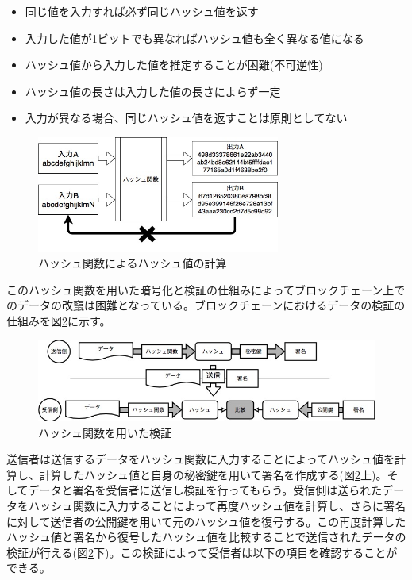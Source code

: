 \documentclass[12pt]{jarticle}
\begin{document}
\begin{itemize}
\item 同じ値を入力すれば必ず同じハッシュ値を返す
\item 入力した値が1ビットでも異なればハッシュ値も全く異なる値になる
\item ハッシュ値から入力した値を推定することが困難(不可逆性)
\item ハッシュ値の長さは入力した値の長さによらず一定
\item 入力が異なる場合、同じハッシュ値を返すことは原則としてない
\end{itemize}

\begin{figure}[h]
 \centering
   \includegraphics[width=80mm]{figures/hash.jpg}
 \caption{ハッシュ関数によるハッシュ値の計算}
 \label{tree1}
\end{figure}

このハッシュ関数を用いた暗号化と検証の仕組みによってブロックチェーン上でのデータの改竄は困難となっている。ブロックチェーンにおけるデータの検証の仕組みを図\ref{check}に示す。

\begin{figure}[h]
 \centering
   \includegraphics[width=120mm]{figures/signature-2.jpg}
 \caption{ハッシュ関数を用いた検証}
 \label{check}
\end{figure}

送信者は送信するデータをハッシュ関数に入力することによってハッシュ値を計算し、計算したハッシュ値と自身の秘密鍵を用いて署名を作成する(図\ref{check}上)。そしてデータと署名を受信者に送信し検証を行ってもらう。受信側は送られたデータをハッシュ関数に入力することによって再度ハッシュ値を計算し、さらに署名に対して送信者の公開鍵を用いて元のハッシュ値を復号する。この再度計算したハッシュ値と署名から復号したハッシュ値を比較することで送信されたデータの検証が行える(図\ref{check}下)。この検証によって受信者は以下の項目を確認することができる。
\end{document}
